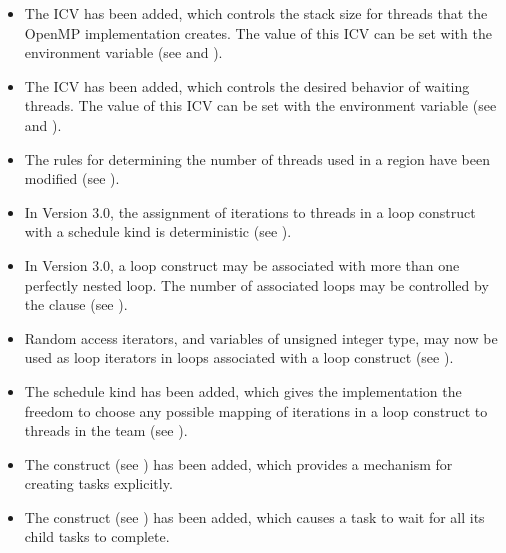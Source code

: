 \begin{itemize}
\item The  ICV has been added, which controls the stack size for threads that
the OpenMP implementation creates. The value of this ICV can be set with the
 environment variable (see
 and
).

\item The  ICV has been added, which controls the desired behavior of
waiting threads. The value of this ICV can be set with the 
environment variable (see
 and
).

\item The rules for determining the number of threads used in a  region have
been modified (see
).

\item In Version 3.0, the assignment of iterations to threads in a loop construct with a
 schedule kind is deterministic (see
).

\item In Version 3.0, a loop construct may be associated with more than one perfectly
nested loop. The number of associated loops may be controlled by the 
clause (see
).

\item Random access iterators, and variables of unsigned integer type, may now be used as
loop iterators in loops associated with a loop construct (see
).

\item The schedule kind  has been added, which gives the implementation the
freedom to choose any possible mapping of iterations in a loop construct to threads in
the team (see ).

\item The  construct (see ) has been
      added, which provides a mechanism for creating tasks explicitly.

\item The  construct (see
) has been added, which
causes a task to wait for all its child tasks to complete.


\end{itemize}
